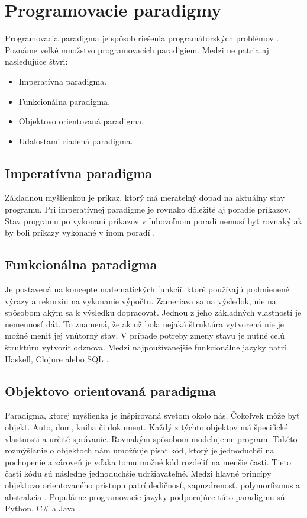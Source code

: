 \section{Programovacie paradigmy}
\noindent Programovacia paradigma je spôsob riešenia programátorských problémov \cite{Samuel2018AnII}. Poznáme veľké množstvo programovacích paradigiem. Medzi ne patria aj nasledujúce štyri:
\begin{itemize}
  \item Imperatívna paradigma.
  \item Funkcionálna paradigma.
  \item Objektovo orientovaná paradigma.
  \item Udalosťami riadená paradigma.
\end{itemize}

\subsection{Imperatívna paradigma}
\noindent Základnou myšlienkou je príkaz, ktorý má merateľný dopad na aktuálny stav 
programu. Pri imperatívnej paradigme je rovnako dôležité aj poradie príkazov. Stav 
programu po vykonaní príkazov v ľubovoľnom poradí nemusí byť rovnaký ak by boli príkazy 
vykonané v inom poradí \cite{imperativParadigm}. 

\subsection{Funkcionálna paradigma}
\noindent Je postavená na koncepte matematických funkcií, ktoré používajú podmienené 
výrazy a rekurziu na vykonanie výpočtu. Zameriava sa na výsledok, nie na spôsobom akým 
sa k výsledku dopracovať. Jednou z jeho základných vlastností je nemennosť dát. To 
znamená, že ak už bola nejaká štruktúra vytvorená nie je možné meniť jej vnútorný stav. 
V prípade potreby zmeny stavu je nutné celú štruktúru vytvoriť odznova. Medzi 
najpoužívanejšie funkcionálne jazyky patrí Haskell, Clojure alebo SQL \cite{functionalParadigm}.

\subsection{Objektovo orientovaná paradigma}
\noindent Paradigma, ktorej myšlienka je inšpirovaná svetom okolo nás. Čokoľvek môže 
byť objekt. Auto, dom, kniha či dokument. Každý z týchto objektov má špecifické vlastnosti 
a určité správanie. Rovnakým spôsobom modelujeme program. Takéto rozmýšľanie o 
objektoch nám umožňuje písať kód, ktorý je jednoduchší na pochopenie a zároveň je 
vďaka tomu možné kód rozdeliť na menšie časti. Tieto časti kódu sú následne 
jednoduchšie udržiavateľné. Medzi hlavné princípy objektovo orientovaného prístupu 
patrí dedičnosť, zapuzdrenosť, polymorfizmus a abstrakcia \cite{objectOrientedParadigm}
. Populárne programovacie jazyky podporujúce túto paradigmu sú Python, C\# a Java \cite
{stack-overflow-survey-2020}.

